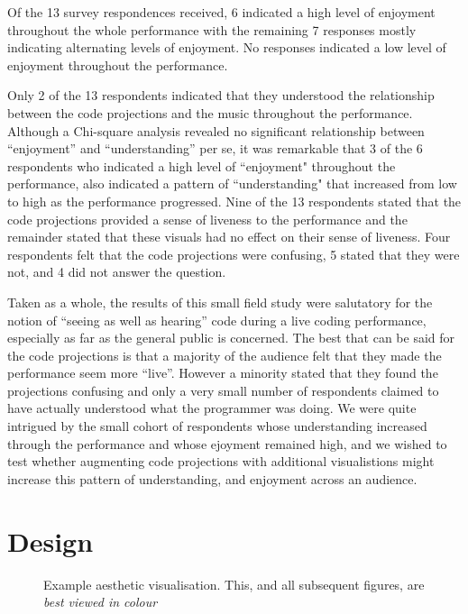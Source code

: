 \documentclass{sig-alternate}
\begin{document}
Of the 13 survey respondences received, 6 indicated a high level of enjoyment throughout the whole performance with the remaining 7 responses mostly indicating alternating levels of enjoyment. No responses indicated a low level of enjoyment throughout the performance.

Only 2 of the 13 respondents indicated that they understood the relationship between the code projections and the music throughout the performance. Although a Chi-square analysis revealed no significant relationship between ``enjoyment'' and ``understanding'' per se, it was remarkable that 3 of the 6 respondents who indicated a high level of ``enjoyment" throughout the performance, also indicated a pattern of ``understanding" that increased from low to high as the performance progressed. Nine of the 13 respondents stated that the code projections provided a sense of liveness to the performance and the remainder stated that these visuals had no effect on their sense of liveness. Four respondents felt that the code projections were confusing, 5 stated that they were not, and 4 did not answer the question.

Taken as a whole, the results of this small field study were salutatory for the notion of ``seeing as well as hearing'' code during a live coding performance, especially as far as the general public is concerned. The best that can be said for the code projections is that a majority of the audience felt that they made the performance seem more ``live''. However a minority stated that they found the projections confusing and only a very small number of respondents claimed to have actually understood what the programmer was doing. We were quite intrigued by the small cohort of respondents whose understanding increased through the performance and whose ejoyment remained high, and we wished to test whether augmenting code projections with additional visualistions might increase this pattern of understanding, and enjoyment across an audience. 

\section{Design}

\begin{figure}
\centering
{}
\caption{Example aesthetic visualisation. This, and all subsequent figures, are {\it best viewed in colour}}
\label{fig:aesthetic-visualisation}
\end{figure}
\end{document}
